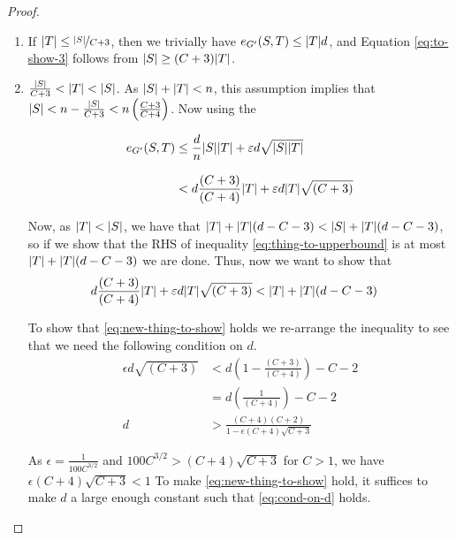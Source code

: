\documentclass[11pt]{article}
\providecommand{\DIFaddbegin}{} %
\providecommand{\DIFaddend}{} %
\providecommand{\DIFdelbegin}{} %
\providecommand{\DIFdelend}{} %
\begin{document}
\begin{proof}
\begin{enumerate}
\item{
    If $\Size{T} \le \nicefrac{\Size{S}}{C+3}$, then we trivially have $\CutEdges{S}{T}{G'} \leq \Size{T}d$, and Equation \eqref{eq:to-show-3} follows from $\Size{S} \geq (C+3)\Size{T}$.
  }

\DIFdelbegin %


\DIFdelend \DIFaddbegin \item{
$ \frac{\Size{S}}{C+3} < \Size{T} < \Size{S}$. As $\Size{S} + \Size{T} < n$, this assumption implies that $\Size{S} < n - \frac{\Size{S}}{C+3} < n\left(\frac{C+3}{C+4}\right)$.
Now using the 

\begin{align}
\CutEdges{S}{T}{G'} &\le \frac{d}{n}\Size{S}\Size{T} + \epsilon d \sqrt{\Size{S}\Size{T}}	\\[8pt]
&< d\frac{(C+3)}{(C+4)}\Size{T} + \epsilon d \Size{T}\sqrt{(C+3)} \label{eq:thing-to-upperbound}
\end{align}

Now, as $\Size{T} < \Size{S}$, we have that $\Size{T} + \Size{T}(d-C-3) < \Size{S} + \Size{T}(d-C-3)$, so if we show that the RHS of inequality \eqref{eq:thing-to-upperbound} is at most $\Size{T} + \Size{T}(d-C-3)$ we are done.
Thus, now we want to show that 
\begin{align}
d\frac{(C+3)}{(C+4)}\Size{T} + \epsilon d \Size{T}\sqrt{(C+3)} &< 	\Size{T} + \Size{T}(d-C-3) \label{eq:new-thing-to-show}
\end{align}

To show that \eqref{eq:new-thing-to-show} holds we re-arrange the inequality to see that we need the following condition on $d$.
\begin{align}
 \epsilon d \sqrt{(C+3)} &< d\left(1 - \frac{(C+3)}{(C+4)}\right) -C-2 \\[8pt]
 &= d\left(\frac{1}{(C+4)}\right) -C-2 \\[8pt]
 d&> \frac{(C+4)(C+2)}{1 - \epsilon(C+4)\sqrt{C+3}} \label{eq:cond-on-d}
\end{align} 

As $\epsilon = \frac{1}{100C^{3/2}}$ and $100C^{3/2} > (C+4)\sqrt{C+3}$ for $C>1$, we have $\epsilon(C+4)\sqrt{C+3} < 1$
To make \eqref{eq:new-thing-to-show} hold, it suffices to make $d$ a large enough constant such that \eqref{eq:cond-on-d} holds.
  }
  \DIFaddend 

\end{enumerate}
\end{proof}  
\end{document}
